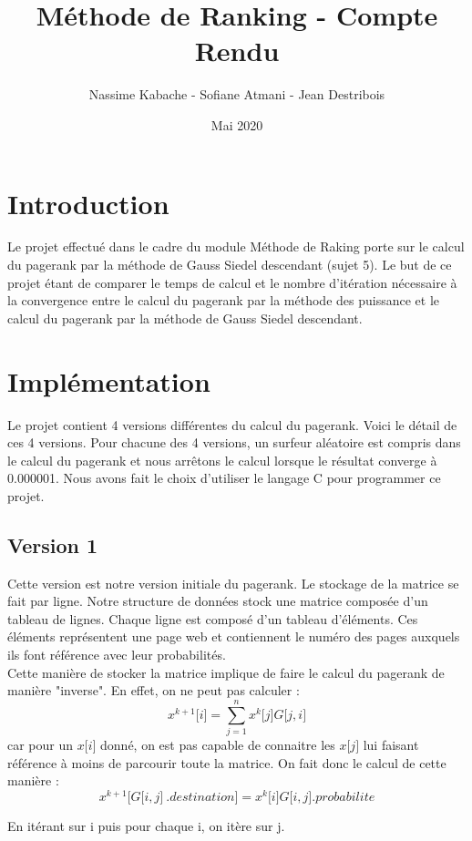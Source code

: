 \documentclass[10pt,a4paper]{article}
\author{Nassime Kabache - Sofiane Atmani - Jean Destribois}
\title{Méthode de Ranking - Compte Rendu}
\date{Mai 2020}
\begin{document}
\maketitle

\section{Introduction}
Le projet effectué dans le cadre du module Méthode de Raking porte sur le calcul du pagerank par la méthode de Gauss Siedel descendant (sujet 5). Le but de ce projet étant de comparer le temps de calcul et le nombre d'itération nécessaire à la convergence entre le calcul du pagerank par la méthode des puissance et le calcul du pagerank par la méthode de Gauss Siedel descendant.


\section{Implémentation}
Le projet contient 4 versions différentes du calcul du pagerank. Voici le détail de ces 4 versions. Pour chacune des 4 versions, un surfeur aléatoire est compris dans le calcul du pagerank et nous arrêtons le calcul lorsque le résultat converge à 0.000001. Nous avons fait le choix d'utiliser le langage C pour programmer ce projet.

\subsection{Version 1}
Cette version est notre version initiale du pagerank. Le stockage de la matrice se fait par ligne. Notre structure de données stock une matrice composée d'un tableau de lignes. Chaque ligne est composé d'un tableau d'éléments. Ces éléments représentent une page web et contiennent le numéro des pages auxquels ils font référence avec leur probabilités.\\
Cette manière de stocker la matrice implique de faire le calcul du pagerank de manière "inverse". En effet, on ne peut pas calculer : 
\[x^{k+1} \lbrack i \rbrack = \sum_{j=1}^{n} x^{k} \lbrack j \rbrack G\lbrack j,i \rbrack\]
car pour un $x \lbrack i \rbrack$ donné, on est pas capable de connaitre les $x \lbrack j \rbrack$ lui faisant référence à moins de parcourir toute la matrice.
On fait donc le calcul de cette manière :
\[x^{k+1} \lbrack G\lbrack i,j \rbrack\ .destination \rbrack = x^{k} \lbrack i \rbrack G\lbrack i,j \rbrack .probabilite\]
\begin{center}
En itérant sur i puis pour chaque i, on itère sur j.
\end{center}
\end{document}
